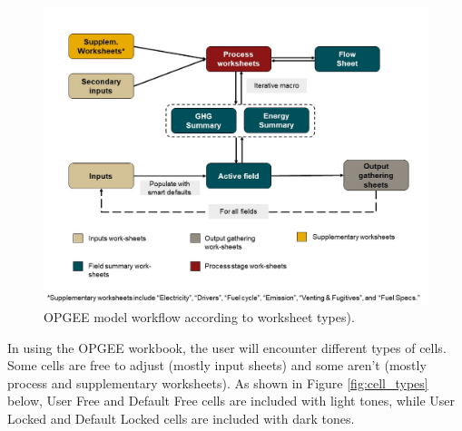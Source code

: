 \documentclass[11pt]{report}
\begin{document}
\begin{landscape}
\begin{figure}[h]
\includegraphics[width=1\columnwidth]{documentation/images/User_Guide_figs/Fig_3.jpg}
\caption{OPGEE model workflow according to worksheet types).}
\label{fig:model_structure}
\end{figure}
\end{landscape}

In using the OPGEE workbook, the user will encounter different types of cells. Some cells are free to adjust (mostly input sheets) and some aren't (mostly process and supplementary worksheets). As shown in Figure \ref{fig:cell_types} below, User Free and Default Free cells are included with light tones, while User Locked and Default Locked cells are included with dark tones. 
\end{document}
